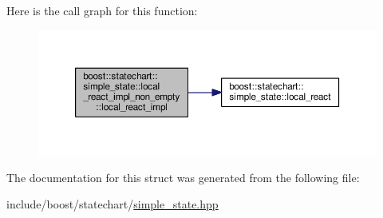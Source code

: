 Here is the call graph for this function\+:
\nopagebreak
\begin{figure}[H]
\begin{center}
\leavevmode
\includegraphics[width=350pt]{structboost_1_1statechart_1_1simple__state_1_1local__react__impl__non__empty_aca7a8dae81c5f8d27405d1c267d9556f_cgraph}
\end{center}
\end{figure}


The documentation for this struct was generated from the following file\+:\begin{DoxyCompactItemize}
\item 
include/boost/statechart/\mbox{\hyperlink{simple__state_8hpp}{simple\+\_\+state.\+hpp}}\end{DoxyCompactItemize}
